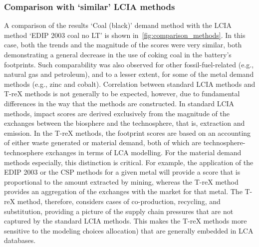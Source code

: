 \documentclass[a4paper,fleqn]{cas-dc}
\begin{document}
\subsubsection{Comparison with `similar' LCIA methods}\label{sec:results-case_study-methodcomparison}

A comparison of the results \protect{} \protect{} `Coal (black)' demand \protect{} method
with the LCIA method `EDIP 2003 \protect\TLSdel{-} \protect{} coal no LT' is shown
in~\autoref{fig:comparison_methods}. In this case, both the trends and the
magnitude of the scores were very similar, both demonstrating a general
decrease in the use of coking coal in the battery's footprints. Such
comparability was also observed for other fossil-fuel-related \protect{} \protect{} (e.g.,
natural gas and petroleum), and to a lesser extent, for some of the metal
demand methods (e.g., zinc and cobalt). Correlation between standard LCIA
methods and T-reX methods is not generally to be expected, however, due to
fundamental differences in the way that the methods are constructed. In
standard LCIA methods, impact scores are derived exclusively from the magnitude
of the exchanges between the biosphere and the technosphere, that is,
extraction and emission. In the T-reX methods, the footprint scores are based
on an accounting of either waste generated or material demand, both of which
are technosphere-technosphere exchanges in terms of LCA modelling. For the
material demand methods especially, this distinction is critical. For example,
the application of the EDIP 2003 or the CSP methods for a given metal will
provide a score that is proportional to the amount extracted by mining, whereas
the T-reX method provides an aggregation of the exchanges with the market for
that metal. The T-reX method, therefore, considers cases of co-production,
recycling, and substitution, providing a picture of the supply chain pressures
that are not captured by the standard LCIA methods. This makes the T-reX
methods more sensitive to the modeling choices \protect{} \protect{} allocation) that
are generally embedded in LCA databases.
\end{document}
